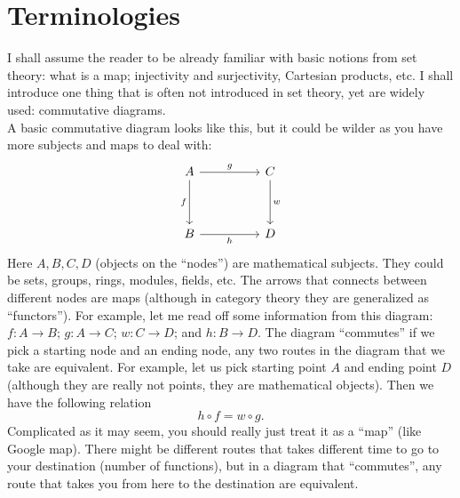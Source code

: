 \documentclass{article}
\begin{document}
\section*{Terminologies}
I shall assume the reader to be already familiar with basic notions from set theory: what is a map; injectivity and surjectivity, Cartesian products, etc. I shall introduce one thing that is often not introduced in set theory, yet are widely used: commutative diagrams. \\
A basic commutative diagram looks like this, but it could be wilder as you have more subjects and maps to deal with: 
\[\begin{tikzcd}
	A && C \\
	\\
	B && D
	\arrow["g", from=1-1, to=1-3]
	\arrow["f"', from=1-1, to=3-1]
	\arrow["w", from=1-3, to=3-3]
	\arrow["h"', from=3-1, to=3-3]
\end{tikzcd}\]
Here $A,B,C,D$ (objects on the ``nodes'') are mathematical subjects. They could be sets, groups, rings, modules, fields, etc. The arrows that connects between different nodes are maps (although in category theory they are generalized as ``functors''). For example, let me read off some information from this diagram: $f: A \to B$; $g: A \to C$; $w: C \to D$; and $h: B \to D$. The diagram ``commutes'' if we pick a starting node and an ending node, any two routes in the diagram that we take are equivalent. For example, let us pick starting point $A$ and ending point $D$ (although they are really not points, they are mathematical objects). Then we have the following relation
\[h \circ f = w \circ g. \]
Complicated as it may seem, you should really just treat it as a ``map'' (like Google map). There might be different routes that takes different time to go to your destination (number of functions), but in a diagram that ``commutes'', any route that takes you from here to the destination are equivalent. 
\end{document}
